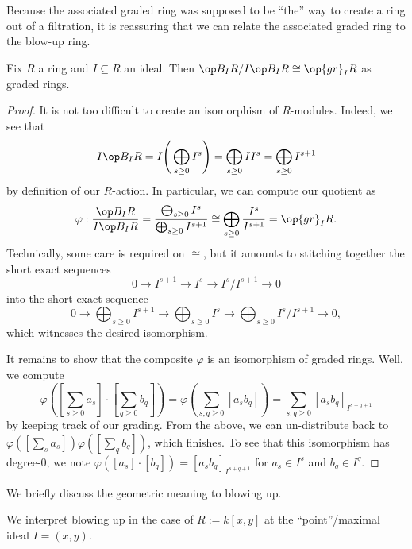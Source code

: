 Because the associated graded ring was supposed to be ``the'' way to create a ring out of a filtration, it is reassuring that we can relate the associated graded ring to the blow-up ring.
\begin{lemma}
	Fix $R$ a ring and $I\subseteq R$ an ideal. Then $\op B_IR/I\op B_IR\cong\op{gr}_IR$ as graded rings.
\end{lemma}
\begin{proof}
	It is not too difficult to create an isomorphism of $R$-modules. Indeed, we see that
	\[I\op B_IR=I\Bigg(\bigoplus_{s\ge0}I^s\Bigg)=\bigoplus_{s\ge0}II^s=\bigoplus_{s\ge0}I^{s+1}\]
	by definition of our $R$-action. In particular, we can compute our quotient as
	\[\varphi:\frac{\op B_IR}{I\op B_IR}=\frac{\bigoplus_{s\ge0}I^s}{\bigoplus_{s\ge0}I^{s+1}}\cong\bigoplus_{s\ge0}\frac{I^s}{I^{s+1}}=\op{gr}_IR.\]
	Technically, some care is required on $\cong$, but it amounts to stitching together the short exact sequences
	\[0\to I^{s+1}\to I^s\to I^s/I^{s+1}\to0\]
	into the short exact sequence
	\[0\to\bigoplus_{s\ge0}I^{s+1}\to\bigoplus_{s\ge0}I^s\to\bigoplus_{s\ge0}I^s/I^{s+1}\to0,\]
	which witnesses the desired isomorphism.

	It remains to show that the composite $\varphi$ is an isomorphism of graded rings. Well, we compute
	\[\varphi\left(\left[\sum_{s\ge0}a_s\right]\cdot\left[\sum_{q\ge0}b_q\right]\right)=\varphi\left(\sum_{s,q\ge0}[a_sb_q]\right)=\sum_{s,q\ge0}[a_sb_q]_{I^{s+q+1}}\]
	by keeping track of our grading. From the above, we can un-distribute back to $\varphi\left(\left[\sum_sa_s\right]\right)\varphi\left(\left[\sum_qb_q\right]\right)$, which finishes. To see that this isomorphism has degree-$0$, we note $\varphi([a_s]\cdot [b_q])=[a_sb_q]_{I^{s+q+1}}$ for $a_s\in I^s$ and $b_q\in I^q$.
\end{proof}
We briefly discuss the geometric meaning to blowing up.
\begin{exe}
	We interpret blowing up in the case of $R:=k[x,y]$ at the ``point''/maximal ideal $I=(x,y)$.
\end{exe}
